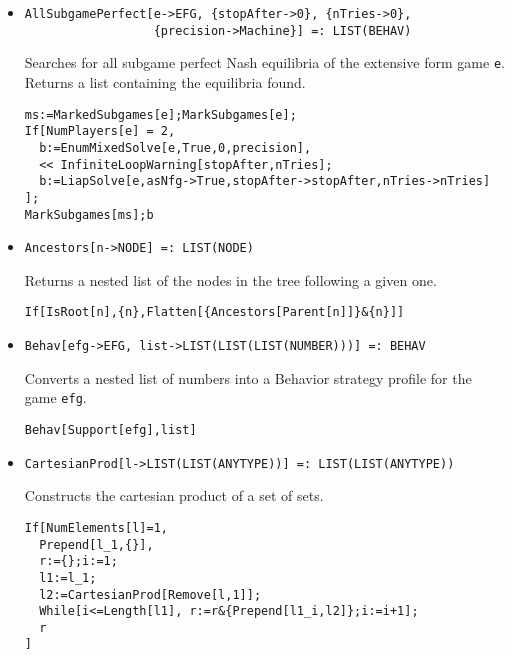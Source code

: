 \begin{itemize}
\item{}
\protect \large \begin{verbatim}
AllSubgamePerfect[e->EFG, {stopAfter->0}, {nTries->0}, 
                  {precision->Machine}] =: LIST(BEHAV) 
\end{verbatim}\normalsize

\bd 
Searches for all subgame perfect Nash equilibria of the extensive
form game \verb+e+.  Returns a list containing the equilibria found.

\begin{verbatim}
ms:=MarkedSubgames[e];MarkSubgames[e];
If[NumPlayers[e] = 2, 
  b:=EnumMixedSolve[e,True,0,precision],
  << InfiniteLoopWarning[stopAfter,nTries];
  b:=LiapSolve[e,asNfg->True,stopAfter->stopAfter,nTries->nTries]
];
MarkSubgames[ms];b
\end{verbatim} 
\ed

\item{}
\protect \large \begin{verbatim}
Ancestors[n->NODE] =: LIST(NODE) 
\end{verbatim}\normalsize

\bd 
Returns a nested list of the nodes in the tree following a given one.  
\begin{verbatim}
If[IsRoot[n],{n},Flatten[{Ancestors[Parent[n]]}&{n}]]
\end{verbatim} 
\ed



\item{}
\protect \large \begin{verbatim}
Behav[efg->EFG, list->LIST(LIST(LIST(NUMBER)))] =: BEHAV 
\end{verbatim}\normalsize

\bd 
Converts a nested list of numbers into a Behavior strategy
profile for the game \verb+efg+.
\begin{verbatim}
Behav[Support[efg],list]
\end{verbatim} 
\ed


\item{}
\protect \large \begin{verbatim}
CartesianProd[l->LIST(LIST(ANYTYPE))] =: LIST(LIST(ANYTYPE)) 
\end{verbatim}\normalsize

\bd 
Constructs the cartesian product of a set of sets.  
\begin{verbatim}
If[NumElements[l]=1,
  Prepend[l_1,{}],
  r:={};i:=1;
  l1:=l_1;
  l2:=CartesianProd[Remove[l,1]];
  While[i<=Length[l1], r:=r&{Prepend[l1_i,l2]};i:=i+1];
  r
]
\end{verbatim} 
\ed
	


\end{itemize}
